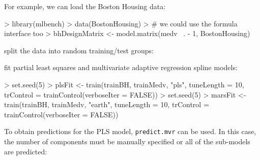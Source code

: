 \documentclass[12pt]{article}
\begin{document}
For example, we can load the Boston Housing data:

\begin{small}
\begin{Schunk}
\begin{Sinput}
> library(mlbench)
> data(BostonHousing)
> # we could use the formula interface too
> bhDesignMatrix <-  model.matrix(medv ~. - 1, BostonHousing)
\end{Sinput}
\end{Schunk}
\end{small}

\noindent split the data into random training/test groups:

\begin{small}
\begin{Schunk}
\end{Schunk}
\end{small}

\noindent fit partial least squares and multivariate adaptive regression spline models:

\begin{small}
\begin{Schunk}
\begin{Sinput}
> set.seed(5)
> plsFit <- train(trainBH, trainMedv, "pls", tuneLength = 10, trControl = trainControl(verboseIter = FALSE))
> set.seed(5)
> marsFit <- train(trainBH, trainMedv, "earth", tuneLength = 10, trControl = trainControl(verboseIter = FALSE))
\end{Sinput}
\end{Schunk}
\end{small}
To obtain predictions  for the PLS model, \texttt{predict.mvr} can be used. In this case, the number of components must be manually specified or all of the sub-models are predicted:
\end{document}
